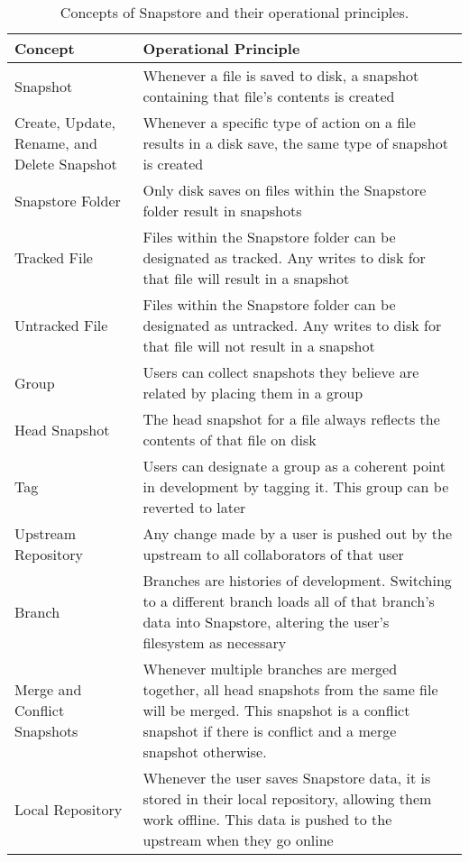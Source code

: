 \begin{table}
\begin{tabular}{ |p{5cm}||p{11cm}|}
 \hline
 \textbf{Concept} & \textbf{Operational Principle}\\[8pt]
 \hline
 Snapshot & Whenever a file is saved to disk, a snapshot containing that file's contents is created\\[8pt]
 Create, Update, Rename, and Delete Snapshot & Whenever a specific type of action on a file results in a disk save, the same type of snapshot is created\\[8pt]
 Snapstore Folder & Only disk saves on files within the Snapstore folder result in snapshots\\[8pt]
 Tracked File & Files within the Snapstore folder can be designated as tracked. Any writes to disk for that file will result in a snapshot\\[8pt]
 Untracked File & Files within the Snapstore folder can be designated as untracked. Any writes to disk for that file will not result in a snapshot\\[8pt]
 \hline
 Group & Users can collect snapshots they believe are related by placing them in a group\\[8pt]
 Head Snapshot & The head snapshot for a file always reflects the contents of that file on disk\\[8pt]
 Tag & Users can designate a group as a coherent point in development by tagging it. This group can be reverted to later\\[8pt]
 \hline
 Upstream Repository & Any change made by a user is pushed out by the upstream to all collaborators of that user\\[8pt]
 \hline
 Branch & Branches are histories of development. Switching to a different branch loads all of that branch's data into Snapstore, altering the user's filesystem as necessary\\[8pt]
 Merge and Conflict Snapshots & Whenever multiple branches are merged together, all head snapshots from the same file will be merged. This snapshot is a conflict snapshot if there is conflict and a merge snapshot otherwise.\\[8pt]
 \hline
 Local Repository & Whenever the user saves Snapstore data, it is stored in their local repository, allowing them work offline. This data is pushed to the upstream when they go online\\[8pt]
 \hline
\end{tabular}
\caption{Concepts of Snapstore and their operational principles.}
\end{table}


